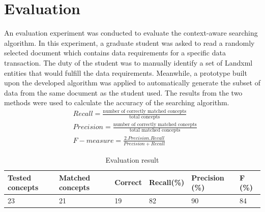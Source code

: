 \documentclass[NewProceedings, InsideFigs]{ascelike} %
\begin{document}
\section{Evaluation} \label{sec:val}
An evaluation experiment was conducted to evaluate the context-aware searching algorithm. In this experiment, a graduate student was asked to read a randomly selected document which contains data requirements for a specific data transaction. The duty of the student was to manually identify a set of Landxml entities that would fulfill the data requirements. Meanwhile, a prototype built upon the developed algorithm was applied to automatically generate the subset of data from the same document as the student used. The results from the two methods were used to calculate the accuracy of the searching algorithm.
%
\begin{align} 
&Recall = \frac{\text{number of correctly matched concepts}}{\text{total concepts}}  \\ 
&Precision = \frac{\text{number of correctly matched concepts}}{\text{total matched concepts}}  \\
&F-measure = \frac{2.Precision.Recall}{Precision+Recall}
\end{align}
%
\begin{table} [b] 
\caption{Evaluation result}
\label{table:eva}
\centering
\small
\renewcommand{\arraystretch}{1.25}
\begin{tabular}{l l l l l l}


\hline
\hline
 Tested concepts & Matched concepts & Correct & Recall(\%) & Precision (\%) & F (\%)\\
 \hline
23 & 21 & 19 & 82 & 90 & 84\\


\hline
\hline
\end{tabular}
\normalsize
\end{table}
\end{document}
